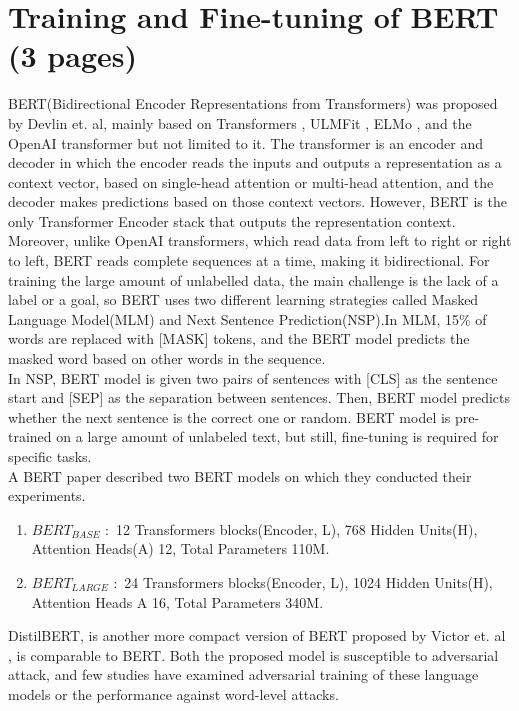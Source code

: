 \documentclass[%
	BCOR=8mm, %
	DIV=12, 
	toc=bibliography, %
	toc=listof, %
	oneside, %
	egregdoesnotlikesansseriftitles, %
	]{scrbook}
\begin{document}
\section{Training and Fine-tuning of BERT (3 pages)}
BERT(Bidirectional Encoder Representations from Transformers) was proposed by Devlin et$.$ al\cite{devlin_bert_2019}, mainly based on Transformers \cite{vaswani_attention_2017}, 
ULMFit \cite{howard_universal_2018}, ELMo \cite{peters_deep_2018}, and the OpenAI transformer \cite{radford_improving_nodate} but not limited to it. 
The transformer is an encoder and decoder in which the encoder reads the inputs and outputs a representation as a context vector, based on single-head attention or multi-head attention, 
and the decoder makes predictions based on those context vectors. However, BERT is the only Transformer Encoder stack that outputs the representation context. Moreover, unlike 
OpenAI transformers, which read data from left to right or right to left, BERT reads complete sequences at a time, making it bidirectional. For training the large amount of unlabelled data, 
the main challenge is the lack of a label or a goal, so BERT uses two different learning strategies called Masked Language Model(MLM) and Next Sentence Prediction(NSP).In MLM, 15\% of 
words are replaced with [MASK] tokens, and the BERT model predicts the masked word based on other words in the sequence.\\

In NSP, BERT model is given two pairs of sentences with [CLS] as the sentence start and [SEP] as the separation between sentences. Then, BERT model predicts whether the next sentence 
is the correct one or random. BERT model is pre-trained on a large amount of unlabeled text, but still, fine-tuning is required for specific tasks.\\

A BERT paper \cite{devlin_bert_2019} described two BERT models on which they conducted their experiments.
\begin{enumerate}
\item $BERT_{BASE}$ $:$ 12 Transformers blocks(Encoder, L), 768 Hidden Units(H), Attention Heads(A) 12, Total Parameters 110M.
\item $BERT_{LARGE}$ $:$ 24 Transformers blocks(Encoder, L), 1024 Hidden Units(H), Attention Heads A 16, Total Parameters 340M.
\end{enumerate}
DistilBERT, is another more compact version of BERT proposed by Victor et$.$ al \cite{sanh_distilbert_2020}, is comparable to BERT. Both the proposed model is susceptible to adversarial 
attack, and few studies have examined adversarial training of these language models or the performance against word-level attacks.\\
\end{document}
